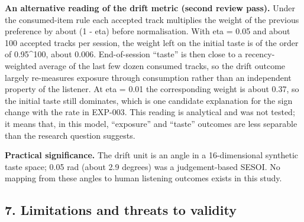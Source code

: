 \documentclass[
]{article}
\begin{document}
\textbf{An alternative reading of the drift metric (second review
pass).} Under the consumed-item rule each accepted track multiplies the
weight of the previous preference by about (1 - eta) before
normalisation. With eta = 0.05 and about 100 accepted tracks per
session, the weight left on the initial taste is of the order of
0.95\^{}100, about 0.006. End-of-session ``taste'' is then close to a
recency-weighted average of the last few dozen consumed tracks, so the
drift outcome largely re-measures exposure through consumption rather
than an independent property of the listener. At eta = 0.01 the
corresponding weight is about 0.37, so the initial taste still
dominates, which is one candidate explanation for the sign change with
the rate in EXP-003. This reading is analytical and was not tested; it
means that, in this model, ``exposure'' and ``taste'' outcomes are less
separable than the research question suggests.

\textbf{Practical significance.} The drift unit is an angle in a
16-dimensional synthetic taste space; 0.05 rad (about 2.9 degrees) was a
judgement-based SESOI. No mapping from these angles to human listening
outcomes exists in this study.

\subsection{7. Limitations and threats to
validity}\label{limitations-and-threats-to-validity}
\end{document}

